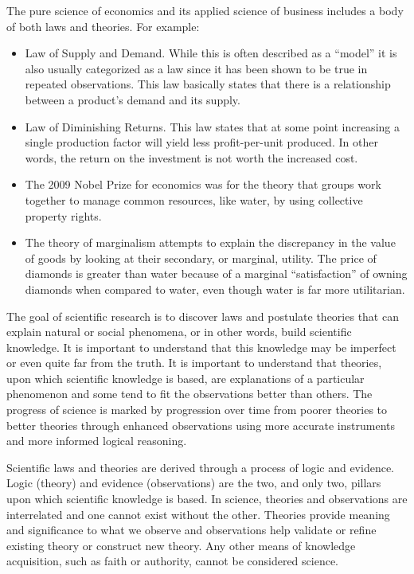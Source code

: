 The pure science of economics and its applied science of business includes a body of both laws and theories. For example:

\begin{itemize}
	\item Law of Supply and Demand. While this is often described as a ``model'' it is also usually categorized as a law since it has been shown to be true in repeated observations. This law basically states that there is a relationship between a product's demand and its supply.

	\item Law of Diminishing Returns. This law states that at some point increasing a single production factor will yield less profit-per-unit produced. In other words, the return on the investment is not worth the increased cost.

	\item The 2009 Nobel Prize for economics was for the theory that groups work together to manage common resources, like water, by using collective property rights.

	\item The theory of marginalism attempts to explain the discrepancy in the value of goods by looking at their secondary, or marginal, utility. The price of diamonds is greater than water because of a marginal ``satisfaction'' of owning diamonds when compared to water, even though water is far more utilitarian.  
\end{itemize}

The goal of scientific research is to discover laws and postulate theories that can explain natural or social phenomena, or in other words, build scientific knowledge. It is important to understand that this knowledge may be imperfect or even quite far from the truth. It is important to understand that theories, upon which scientific knowledge is based, are explanations of a particular phenomenon and some tend to fit the observations better than others. The progress of science is marked by progression over time from poorer theories to better theories through enhanced observations using more accurate instruments and more informed logical reasoning.

Scientific laws and theories are derived through a process of logic and evidence. Logic (theory) and evidence (observations) are the two, and only two, pillars upon which scientific knowledge is based. In science, theories and observations are interrelated and one cannot exist without the other. Theories provide meaning and significance to what we observe and observations help validate or refine existing theory or construct new theory. Any other means of knowledge acquisition, such as faith or authority, cannot be considered science.

